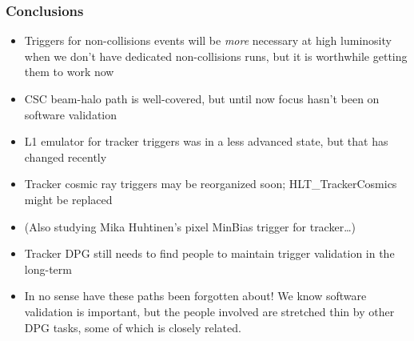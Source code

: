 \documentclass[compress]{beamer}
\begin{document}
\begin{frame}
\frametitle{Conclusions}
\small

\begin{itemize}\setlength{\itemsep}{0.1 cm}

\item Triggers for non-collisions events will be {\it more} necessary
  at high luminosity when we don't have dedicated non-collisions runs,
  but it is worthwhile getting them to work now

\item CSC beam-halo path is well-covered, but until now focus hasn't
  been on software validation

\item L1 emulator for tracker triggers was in a less advanced state,
  but that has changed recently

\item Tracker cosmic ray triggers may be reorganized soon;
  HLT\_TrackerCosmics might be replaced

\item (Also studying Mika Huhtinen's pixel MinBias trigger for tracker\ldots)

\item Tracker DPG still needs to find people to maintain trigger
  validation in the long-term

\item In no sense have these paths been forgotten about!  We know
  software validation is important, but the people involved are
  stretched thin by other DPG tasks, some of which is closely related.
\end{itemize}
\label{numpages}
\end{frame}
\end{document}
